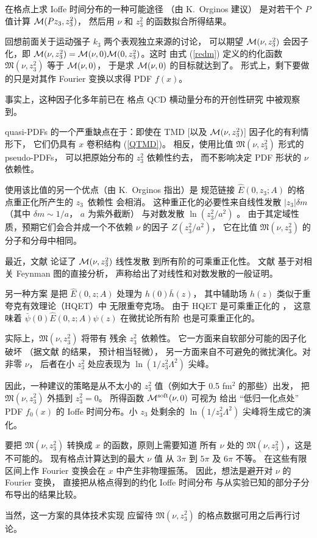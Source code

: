 在格点上求 Ioffe 时间分布的一种可能途径
（由 K.~Orginos 建议）
是对若干个 $P$ 值计算 ${\cal M} (Pz_3, z_3^2)$，
然后用 $\nu$ 和 $z_3^2$ 的函数拟合所得结果。

回想前面关于运动强子 $k_3$ 两个表观独立来源的讨论，
可以期望
${\cal M} (\nu, z_3^2)$ 会因子化，即
${\cal M} (\nu, z_3^2)= {\cal M} (\nu, 0) {\cal M} (0, z_3^2)$。这时
由式 (\ref{redm}) 定义的约化函数 ${\mathfrak M} (\nu, z_3^2) $
等于 $ {\cal M} (\nu, 0)$，
于是求 ${\cal M} (\nu, 0)$ 的目标就达到了。
形式上，剩下要做的只是对其作 Fourier 变换以求得 PDF $f(x)$。

事实上，这种因子化多年前已在
格点 QCD 横动量分布的开创性研究 \cite{Musch:2010ka}
中被观察到。

quasi-PDFs 的一个严重缺点在于：即使在 TMD
[以及 ${\cal M} (\nu, z_3^2)$] 因子化的有利情形下，
它们仍具有 $x$ 卷积结构 (\ref{QTMD})。
相反，使用比值 ${\mathfrak M} (\nu, z_3^2)$ 形式的 pseudo-PDFs，
可以把原始分布的 $z_3^2$ 依赖性约去，
而不影响决定 PDF 形状的 $\nu$ 依赖性。

使用该比值的另一个优点（由 K.~Orginos 指出）是
规范链接 ${ \hat E} (0,z_3; A)$ 的格点重正化所产生的
\mbox{$z_3$ 依赖性}
会相消。
这种重正化的必要性来自线性发散 $|z_3| \delta m$（其中 $\delta m \sim 1/a$，
$a$ 为紫外截断）
与对数发散 $\ln (z_3^2/a^2)$ \cite{Polyakov:1980ca,Dotsenko:1979wb}。
由于其定域性质，预期它们会合并成一个不依赖 $\nu$ 的因子
$Z(z_3^2/a^2)$，
它在比值 ${\mathfrak M} (\nu, z_3^2) $ 的分子和分母中相同。

最近，文献 \cite{Ishikawa:2016znu,Chen:2016fxx}
论证了 ${\cal M} (\nu, z_3^2)$ 线性发散
到所有阶的可乘重正化性。
文献 \cite{Ishikawa:2017faj}
基于对相关 Feynman 图的直接分析，
声称给出了对线性和对数发散的一般证明。

另一种方案 \cite{Ji:2017oey,Green:2017xeu}
是把 $ \hat E(0,z;A) $ 处理为
$ h(0) \bar h (z) $，
其中辅助场 $h(z)$ 类似于重夸克有效理论（HQET）中
无限重夸克场。
由于 HQET 是可乘重正化的 \cite{Bagan:1993zv}，
这意味着 $\bar \psi(0)  \hat E(0,z;A) \psi (z)$ 在微扰论所有阶
也是可乘重正化的。

实际上，${\mathfrak M} (\nu, z_3^2)$ 将带有
残余 \mbox{$z_3^2$ 依赖性。}
它一方面来自软部分可能的因子化破坏
（据文献 \cite{Musch:2010ka} 的结果，
预计相当轻微），
另一方面来自不可避免的微扰演化。对非零 $\nu$，
后者在小 $z_3^2$ 处应表现为
$\ln (1/z_3^2 \Lambda^2)$ 尖峰。

因此，一种建议的策略是从不太小的 $z_3^2$
值（例如大于 0.5 fm$^2$ 的那些）出发，
把 ${\mathfrak M} (\nu, z_3^2)$ 外插到 $z_3^2=0$。
所得函数 ${\cal M} ^{\rm soft}(\nu,0)$ 可视为
给出 ``低归一化点处'' PDF $f_0(x)$
的 Ioffe 时间分布。小 $z_3$ 处剩余的
$\ln (1/z_3^2 \Lambda^2)$ 尖峰将生成它的演化。

要把 ${\mathfrak M} (\nu, z_3^2)$ 转换成 $x$ 的函数，原则上需要知道
所有 $\nu$ 处的 ${\mathfrak M} (\nu, z_3^2)$，这是不可能的。
现有格点计算达到的最大 $\nu$ 值
从 $3\pi $ \cite{Lin:2014zya} 到 $5\pi$ \cite{Alexandrou:2015rja} 及 $6 \pi $ \cite{Orginos:2017kos} 不等。
在这些有限区间上作 Fourier 变换会在 $x$ 中产生非物理振荡。
因此，想法是避开对 $\nu$ 的 Fourier 变换，
直接把从格点得到的约化 Ioffe 时间分布
与从实验已知的部分子分布导出的结果比较。

当然，这一方案的具体技术实现
应留待 ${\mathfrak M} (\nu, z_3^2)$ 的格点数据可用之后再行讨论。

